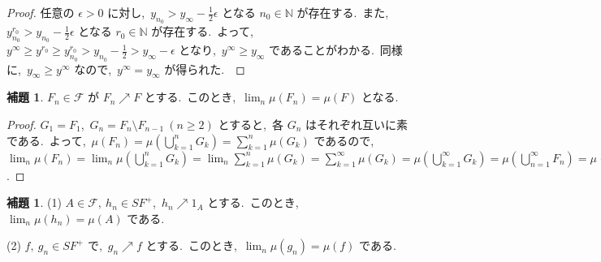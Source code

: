 \documentclass[a4j,11pt]{jarticle}
\theoremstyle{definition}
\newtheorem{lemma}[theorem]{補題}
\begin{document}
\begin{proof}
  任意の
  $\epsilon > 0$
  に対し,\ 
  $y_{n_0} > y_\infty - \frac{1}{2}\epsilon$
  となる
  $n_0 \in \mathbb{N}$
  が存在する.\ 
  また,\ 
  $y_{n_0}^{r_0} > y_{n_0} - \frac{1}{2}\epsilon$
  となる
  $r_0 \in \mathbb{N}$
  が存在する.\ 
  よって,\ 
  $y^{\infty} \geq y^{r_0} \geq y_{n_0}^{r_0} > y_{n_0} - \frac{1}{2} > y_{\infty} - \epsilon$
  となり,\ 
  $y^{\infty} \geq y_{\infty}$
  であることがわかる.\ 
  同様に,\ 
  $y_{\infty} \geq y^{\infty}$
  なので,\ 
  $y^{\infty} = y_{\infty}$
  が得られた.\ 
\end{proof}


\begin{lemma} \label{lemma:mono_set}
  $F_n \in \mathcal{F}$
  が
  $F_n \nearrow F$
  とする.\ 
  このとき,\ 
  $\lim_{n} \mu(F_n) = \mu(F)$
  となる.\ 
\end{lemma}


\begin{proof}
  $G_1 = F_1$,\ 
  $G_n = F_n \setminus F_{n-1}\ (n\geq2)$
  とすると,\ 各
  $G_n$
  はそれぞれ互いに素である.\ 
  よって,\ 
  $\mu(F_n) = \mu(\bigcup_{k=1}^n G_k) = \sum_{k=1}^n \mu(G_k)$
  であるので,\ 
  $\lim_{n} \mu(F_n) = \lim_n \mu\left( \bigcup_{k=1}^n G_k\right) = \lim_n \sum_{k=1}^n \mu(G_k)  = \sum_{k=1}^{\infty} \mu(G_k) = \mu\left( \bigcup_{k=1}^{\infty} G_k\right) = \mu\left( \bigcup_{n=1}^{\infty}F_n\right) = \mu(F)$.
\end{proof}

\begin{lemma}\label{lemma:point_convergence}
  (1)
  $A \in \mathcal{F},\ h_n \in SF^+$,\ 
  $h_n \nearrow 1_A$
  とする.\ 
  このとき,\ 
  $\lim_n \mu(h_n) = \mu(A)$
  である.\ 

  (2)
  $f,\ g_n \in SF^+$
  で,\ 
  $g_n \nearrow f$
  とする.\ 
  このとき,\ 
  $\lim_n \mu(g_n) = \mu(f)$
  である.\ 
\end{lemma}
\end{document}
